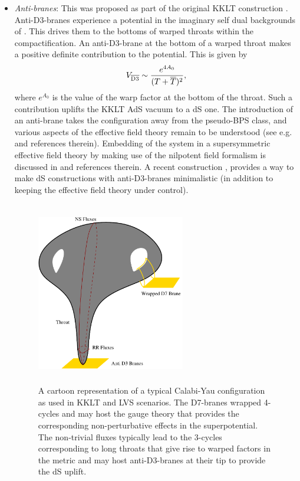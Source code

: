 \begin{itemize}

\item {\it Anti-branes}: This was proposed as part of the original KKLT construction  \cite{Kachru:2003aw}.  Anti-D3-branes experience
a potential in the imaginary self dual backgrounds of \cite{Giddings:2001yu}. This drives them  to the bottoms of warped throats within the compactification.
An anti-D3-brane at the bottom of a warped throat makes a positive definite contribution to the potential. This is given by
$$
   V_{\overline{\rm D3}} \sim { e^{4A_0} \over {(T+ \overline{T})^2} },
$$
where $e^{A_0}$ is the value of the warp factor at the bottom of the throat. Such a contribution uplifts the KKLT AdS vacuum to a dS one. 
The introduction of an anti-brane takes the configuration away from the pseudo-BPS class, and
various aspects of the effective field theory remain to be understood (see  e.g. \cite{Bena:2018fqc, Dudas:2019pls, Bena:2009xk, Polchinski:2015bea, Kachru:2019dvo, Bento:2021nbb, Moritz:2018ani, Gao:2020xqh, Gautason:2019jwq, Bena:2022ive} and references therein).  Embedding of the system in a supersymmetric effective field theory by making use of the nilpotent field formalism is discussed in \cite{Kallosh:2015nia} and references therein. A recent construction
\cite{Bena:2022cwb}, provides a way to make dS constructions with anti-D3-branes minimalistic (in addition to keeping the effective field theory under control).

\begin{figure}[t]
\begin{center}
\includegraphics[width=65mm,height=80mm]{Sections/Figures/throatCY.pdf} 
\caption{A cartoon representation of a typical Calabi-Yau configuration as used in KKLT and LVS scenarios. The D7-branes wrapped 4-cycles and may host the gauge theory that provides the corresponding non-perturbative effects in the superpotential. The non-trivial fluxes typically lead to the 3-cycles corresponding to long throats that give rise to warped factors in the metric and may host anti-D3-branes at their tip to provide the dS uplift.} \label{Fig:CY3} 
\end{center}
\end{figure}



\end{itemize}
